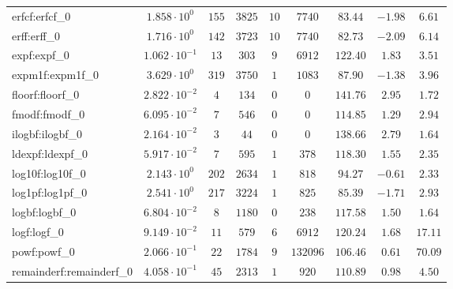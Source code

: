 \begin{tabular}{|l|c|c|c|c|c|c|c|c|}
erfcf:erfcf\_0               & $ 1.858 \cdot 10^{0}  $ & $ 155    $ & $ 3825  $ & $ 10  $ & $ 7740   $ & $ 83.44       $ & $ -1.98   $ & $ 6.61    $ \\
erff:erff\_0                 & $ 1.716 \cdot 10^{0}  $ & $ 142    $ & $ 3723  $ & $ 10  $ & $ 7740   $ & $ 82.73       $ & $ -2.09   $ & $ 6.14    $ \\
expf:expf\_0                 & $ 1.062 \cdot 10^{-1} $ & $ 13     $ & $ 303   $ & $ 9   $ & $ 6912   $ & $ 122.40      $ & $ 1.83    $ & $ 3.51    $ \\
expm1f:expm1f\_0             & $ 3.629 \cdot 10^{0}  $ & $ 319    $ & $ 3750  $ & $ 1   $ & $ 1083   $ & $ 87.90       $ & $ -1.38   $ & $ 3.96    $ \\
floorf:floorf\_0             & $ 2.822 \cdot 10^{-2} $ & $ 4      $ & $ 134   $ & $ 0   $ & $ 0      $ & $ 141.76      $ & $ 2.95    $ & $ 1.72    $ \\
fmodf:fmodf\_0               & $ 6.095 \cdot 10^{-2} $ & $ 7      $ & $ 546   $ & $ 0   $ & $ 0      $ & $ 114.85      $ & $ 1.29    $ & $ 2.94    $ \\
ilogbf:ilogbf\_0             & $ 2.164 \cdot 10^{-2} $ & $ 3      $ & $ 44    $ & $ 0   $ & $ 0      $ & $ 138.66      $ & $ 2.79    $ & $ 1.64    $ \\
ldexpf:ldexpf\_0             & $ 5.917 \cdot 10^{-2} $ & $ 7      $ & $ 595   $ & $ 1   $ & $ 378    $ & $ 118.30      $ & $ 1.55    $ & $ 2.35    $ \\
log10f:log10f\_0             & $ 2.143 \cdot 10^{0}  $ & $ 202    $ & $ 2634  $ & $ 1   $ & $ 818    $ & $ 94.27       $ & $ -0.61   $ & $ 2.33    $ \\
log1pf:log1pf\_0             & $ 2.541 \cdot 10^{0}  $ & $ 217    $ & $ 3224  $ & $ 1   $ & $ 825    $ & $ 85.39       $ & $ -1.71   $ & $ 2.93    $ \\
logbf:logbf\_0               & $ 6.804 \cdot 10^{-2} $ & $ 8      $ & $ 1180  $ & $ 0   $ & $ 238    $ & $ 117.58      $ & $ 1.50    $ & $ 1.64    $ \\
logf:logf\_0                 & $ 9.149 \cdot 10^{-2} $ & $ 11     $ & $ 579   $ & $ 6   $ & $ 6912   $ & $ 120.24      $ & $ 1.68    $ & $ 17.11   $ \\
powf:powf\_0                 & $ 2.066 \cdot 10^{-1} $ & $ 22     $ & $ 1784  $ & $ 9   $ & $ 132096 $ & $ 106.46      $ & $ 0.61    $ & $ 70.09   $ \\
remainderf:remainderf\_0     & $ 4.058 \cdot 10^{-1} $ & $ 45     $ & $ 2313  $ & $ 1   $ & $ 920    $ & $ 110.89      $ & $ 0.98    $ & $ 4.50    $ \\

\end{tabular}
